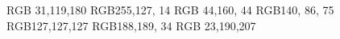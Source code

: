 \definecolor{label-running} {RGB}{ 31,119,180}
\definecolor{label-walking} {RGB}{255,127, 14}
\definecolor{label-jumping} {RGB}{ 44,160, 44}
\definecolor{label-sitting} {RGB}{140, 86, 75}
\definecolor{label-lying}   {RGB}{127,127,127}
\definecolor{label-falling} {RGB}{188,189, 34}
\definecolor{label-transit} {RGB}{ 23,190,207}

\newcommand{\labelbox}[1]{%
    \raisebox{1.6pt}{\fcolorbox{black}{#1}{\rule[2.5pt]{5pt}{0pt}}}\quad
}
